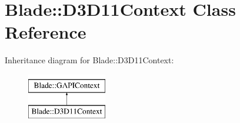 \hypertarget{class_blade_1_1_d3_d11_context}{}\section{Blade\+:\+:D3\+D11\+Context Class Reference}
\label{class_blade_1_1_d3_d11_context}
Inheritance diagram for Blade\+:\+:D3\+D11\+Context\+:\begin{figure}[H]
\begin{center}
\leavevmode
\includegraphics[height=2.000000cm]{class_blade_1_1_d3_d11_context}
\end{center}
\end{figure}

